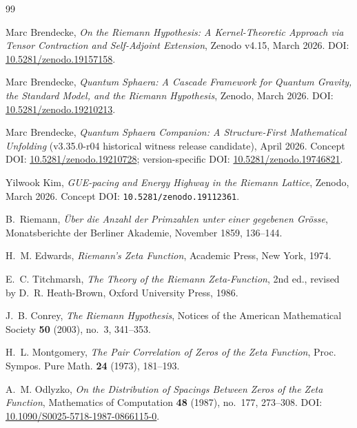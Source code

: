 \begin{thebibliography}{99}

Marc Brendecke,
\emph{On the Riemann Hypothesis: A Kernel-Theoretic Approach via Tensor Contraction and Self-Adjoint Extension},
Zenodo v4.15, March 2026.
\newblock DOI: \href{https://doi.org/10.5281/zenodo.19157158}{10.5281/zenodo.19157158}.

Marc Brendecke,
\emph{Quantum Sphaera: A Cascade Framework for Quantum Gravity, the Standard Model, and the Riemann Hypothesis},
Zenodo, March 2026.
\newblock DOI: \href{https://doi.org/10.5281/zenodo.19210213}{10.5281/zenodo.19210213}.

Marc Brendecke,
\emph{Quantum Sphaera Companion: A Structure-First Mathematical Unfolding} (v3.35.0-r04 historical witness release candidate),
April 2026.
\newblock Concept DOI: \href{https://doi.org/10.5281/zenodo.19210728}{10.5281/zenodo.19210728}; version-specific DOI: \href{https://doi.org/10.5281/zenodo.19746821}{10.5281/zenodo.19746821}.

Yilwook Kim,
\emph{GUE-pacing and Energy Highway in the Riemann Lattice},
Zenodo, March 2026.
\newblock Concept DOI: \texttt{10.5281/zenodo.19112361}.

B.~Riemann,
\emph{\"Uber die Anzahl der Primzahlen unter einer gegebenen Gr\"osse},
Monatsberichte der Berliner Akademie, November 1859, 136--144.

H.~M. Edwards,
\emph{Riemann's Zeta Function},
Academic Press, New York, 1974.

E.~C. Titchmarsh,
\emph{The Theory of the Riemann Zeta-Function},
2nd ed., revised by D.~R. Heath-Brown,
Oxford University Press, 1986.

J.~B. Conrey,
\emph{The Riemann Hypothesis},
Notices of the American Mathematical Society \textbf{50} (2003), no.~3, 341--353.

H.~L. Montgomery,
\emph{The Pair Correlation of Zeros of the Zeta Function},
Proc. Sympos. Pure Math. \textbf{24} (1973), 181--193.

A.~M. Odlyzko,
\emph{On the Distribution of Spacings Between Zeros of the Zeta Function},
Mathematics of Computation \textbf{48} (1987), no.~177, 273--308.
\newblock DOI: \href{https://doi.org/10.1090/S0025-5718-1987-0866115-0}{10.1090/S0025-5718-1987-0866115-0}.


\end{thebibliography}

